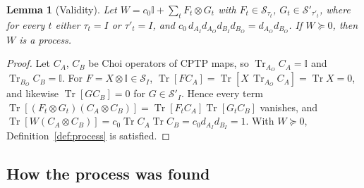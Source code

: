\documentclass[aps,pra,onecolumn,notitlepage,superscriptaddress,longbibliography,nofootinbib,11pt]{revtex4-2}
\newtheorem{lemma}{Lemma}
\theoremstyle{remark}
\newcommand{\Tr}{\operatorname{Tr}}
\newcommand{\one}{\mathbb{I}}
\begin{document}
\begin{lemma}[Validity]\label{lem:S-valid}
Let $W=c_0\one+\sum_tF_t\otimes G_t$ with $F_t\in\mathcal S_{\tau_t}$, $G_t\in\mathcal S'_{\tau'_t}$, where for every $t$ either $\tau_t=I$ or $\tau'_t=I$, and $c_0\,d_{A_I}d_{A_O}d_{B_I}d_{B_O}=d_{A_O}d_{B_O}$. If $W\succeq0$, then $W$ is a process.
\end{lemma}

\begin{proof}
Let $C_A$, $C_B$ be Choi operators of CPTP maps, so $\Tr_{A_O}C_A=\one$ and $\Tr_{B_O}C_B=\one$. For $F=X\otimes\one\in\mathcal S_I$, $\Tr[FC_A]=\Tr[X\,\Tr_{A_O}C_A]=\Tr X=0$, and likewise $\Tr[GC_B]=0$ for $G\in\mathcal S'_I$. Hence every term $\Tr[(F_t\otimes G_t)(C_A\otimes C_B)]=\Tr[F_tC_A]\Tr[G_tC_B]$ vanishes, and $\Tr[W(C_A\otimes C_B)]=c_0\Tr C_A\Tr C_B=c_0d_{A_I}d_{B_I}=1$. With $W\succeq0$, Definition~\ref{def:process} is satisfied.
\end{proof}

\subsection{How the process was found}
\end{document}
